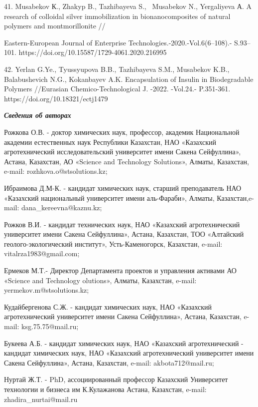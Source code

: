 \begin{noparindent}
41. Musabekov К., Zhakyp B., Tazhibayeva S., ~Musabekov N., Yergaliyeva
А. A research of colloidal silver immobilization in bionanocomposites of
natural polymers and montmorillonite //

Eastern-European Journal of Enterprise
Technologies.-2020.-Vol.6(6--108).- S.93--101.
https://doi.org/10.15587/1729-4061.2020.216995

42. Yerlan G.Ye., Tyussyupova B.B., Tazhibayeva S.M., Musabekov K.B.,
Balabushevich N.G., Kokanbayev A.K. Encapsulation of Insulin in
Biodegradable Polymers //Eurasian Chemico-Technological J. -2022.
-Vol.24.- P.351-361. https://doi.org/10.18321/ectj1479
\end{noparindent}

\emph{{\bfseries Сведения об авторах}}

\begin{noparindent}
Рожкова О.В. - доктор химических наук, профессор, академик Национальной
академии естественных наук Республики Казахстан, НАО «Казахский
агротехнический исследовательский университет имени Сакена Сейфуллина»,
Астана, Казахстан, АО «Science and Technology Solutions», Алматы,
Казахстан, e-mail: rozhkova.o@stsolutions.kz;

Ибраимова Д.М-К. - кандидат химических наук, старший преподаватель НАО
«Казахский национальный университет имени аль-Фараби», Алматы,
Казахстан,e-mail: dana\_kereevna@kaznu.kz;

Рожков В.И. - кандидат технических наук, НАО «Казахский агротехнический
университет имени Сакена Сейфуллина», Астана, Казахстан, ТОО «Алтайский
геолого-экологический институт», Усть-Каменогорск, Казахстан, e-mail:
vitalrza1983@gmail.com;

Ермеков М.Т.- Директор Департамента проектов и управления активами АО
«Science and Technology olutions», Алматы, Казахстан, e-mail:
yermekov.m@stsolutions.kz;

Кудайбергенова С.Ж. - кандидат химических наук, НАО «Казахский
агротехнический университет имени Сакена Сейфуллина», Астана, Казахстан,
e-mail: ksg.75.75@mail.ru;

Букеева А.Б. - кандидат химических наук, НАО «Казахский агротехнический
- кандидат химических наук, НАО «Казахский агротехнический университет
имени Сакена Сейфуллина», Астана, Казахстан, e-mail: akbota712@mail.ru;

Нуртай Ж.Т. - PhD, ассоциированный профессор Казахский Университет
технологии и бизнеса им К.Кулажанова Астана, Казахстан, e-mail:
zhadira\_nurtai@mail.ru
\end{noparindent}

